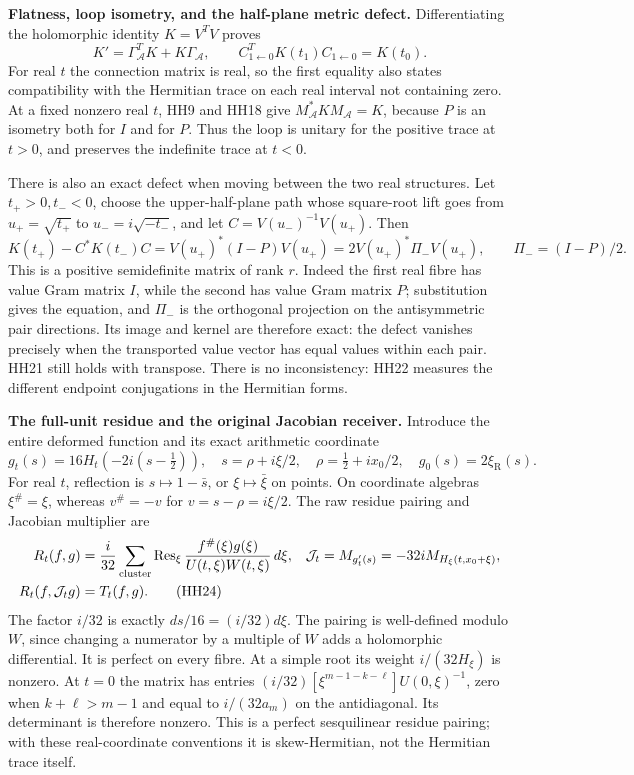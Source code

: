 \HH\textbf{Flatness, loop isometry, and the half-plane metric defect.}
Differentiating the holomorphic identity $K=V^TV$ proves
\[
 K'=\Gamma_{\mathcal A}^T K+K\Gamma_{\mathcal A},\qquad
 C_{1\gets0}^T K(t_1)C_{1\gets0}=K(t_0).
 \tag{HH21}\label{hh:bilinear-flat}
\]
For real $t$ the connection matrix is real, so the first equality
also states compatibility with the Hermitian trace on each real
interval not containing zero.
At a fixed nonzero real $t$, HH9 and HH18 give
$M_{\mathcal A}^*K M_{\mathcal A}=K$, because $P$ is an isometry
both for $I$ and for $P$. Thus the loop is unitary for the positive
trace at $t>0$, and preserves the indefinite trace at $t<0$.

There is also an exact defect when moving between the two real
structures. Let $t_+>0,t_-<0$, choose the upper-half-plane path
whose square-root lift goes from $u_+=\sqrt{t_+}$ to
$u_-=i\sqrt{-t_-}$, and let $C=V(u_-)^{-1}V(u_+)$.
Then
\[
 K(t_+)-C^*K(t_-)C
     =V(u_+)^*(I-P)V(u_+)
     =2V(u_+)^*\Pi_-V(u_+),\qquad
 \Pi_-=(I-P)/2 .
 \tag{HH22}\label{hh:halfplane}
\]
This is a positive semidefinite matrix of rank $r$.
Indeed the first real fibre has value Gram matrix $I$, while the
second has value Gram matrix $P$; substitution gives the equation,
and $\Pi_-$ is the orthogonal projection on the antisymmetric
pair directions. Its image and kernel are therefore exact:
the defect vanishes precisely when the transported value vector
has equal values within each pair. HH21 still holds with transpose.
There is no inconsistency: HH22 measures the different endpoint
conjugations in the Hermitian forms.

\HH\textbf{The full-unit residue and the original Jacobian receiver.}
Introduce the entire deformed function and its exact arithmetic
coordinate
\[
 g_t(s)=16H_t(-2i(s-\tfrac12)),\quad
 s=\rho+i\xi/2,\quad \rho=\tfrac12+ix_0/2,\quad
 g_0(s)=2\xi_{\mathrm R}(s).
 \tag{HH23}\label{hh:g}
\]
For real $t$, reflection is $s\mapsto1-\bar s$, or
$\xi\mapsto\bar\xi$ on points. On coordinate algebras $\xi^\#=\xi$,
whereas $v^\#=-v$ for $v=s-\rho=i\xi/2$.
The raw residue pairing and Jacobian multiplier are
\begin{align}
 R_t(f,g)&=\frac{i}{32}\sum_{\text{cluster}}
       \operatorname{Res}_\xi
       \frac{f^\#(\xi)g(\xi)}
            {U(t,\xi)W(t,\xi)}\,d\xi,&
 \mathcal J_t&=M_{g_t'(s)}=-32iM_{H_\xi(t,x_0+\xi)},\notag\\
 R_t(f,\mathcal J_tg)&=T_t(f,g).
 \tag{HH24}\label{hh:residue}
\end{align}
The factor $i/32$ is exactly $ds/16=(i/32)d\xi$.
The pairing is well-defined modulo $W$, since changing a numerator
by a multiple of $W$ adds a holomorphic differential.
It is perfect on every fibre. At a simple root its weight
$i/(32H_\xi)$ is nonzero. At $t=0$ the matrix has entries
$(i/32)[\xi^{m-1-k-\ell}]U(0,\xi)^{-1}$, zero when
$k+\ell>m-1$ and equal to $i/(32a_m)$ on the antidiagonal.
Its determinant is therefore nonzero. This is a perfect
sesquilinear residue pairing; with these real-coordinate conventions
it is skew-Hermitian, not the Hermitian trace itself.

